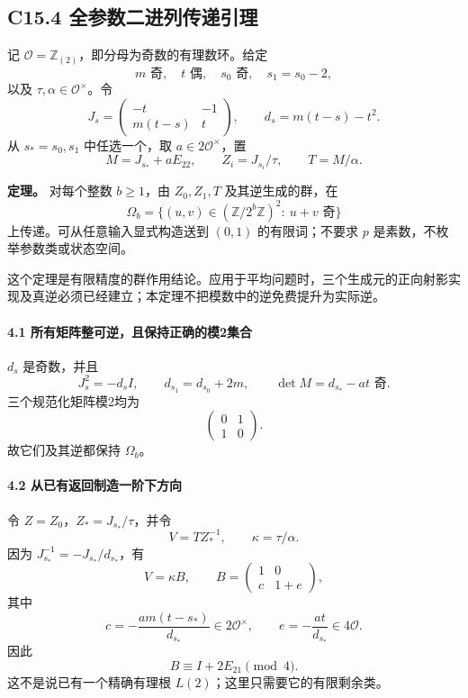 \documentclass[11pt,a4paper]{article}
\theoremstyle{definition}
\numberwithin{equation}{section}
\begin{document}
\subsection*{\texorpdfstring{{C15.4} {全参数二进列传递引理}}{C15.4 全参数二进列传递引理}}\label{C15-h107}

{记} \(\mathcal O=\mathbb Z_{(2)}\){，即分母为奇数的有理数环。给定} \[
m\text{ 奇},\quad t\text{ 偶},\quad s_0\text{ 奇},\quad s_1=s_0-2,
\] {以及} \(\tau,\alpha\in\mathcal O^\times\){。令} \[
J_s=\begin{pmatrix}-t&-1\\m(t-s)&t\end{pmatrix},
\qquad d_s=m(t-s)-t^2.
\] {从} \(s_*=s_0,s_1\) {中任选一个，取} \(a\in2\mathcal O^\times\){，置} \[
M=J_{s_*}+aE_{22},\qquad
Z_i=J_{s_i}/\tau,\qquad T=M/\alpha.
\]

\textbf{{定理。}} {对每个整数} \(b\ge1\){，由} \(Z_0,Z_1,T\) {及其逆生成的群，在} \[
\Omega_b=\{(u,v)\in(\mathbb Z/2^b\mathbb Z)^2:\ u+v\text{ 奇}\}
\] {上传递。可从任意输入显式构造送到} \((0,1)\) {的有限词；不要求} \(p\) {是素数，不枚举参数类或状态空间。}

{这个定理是有限精度的群作用结论。应用于平均问题时，三个生成元的正向射影实现及真逆必须已经建立；本定理不把模数中的逆免费提升为实际逆。}

\paragraph*{\texorpdfstring{{4.1} {所有矩阵整可逆，且保持正确的模2集合}}{4.1 所有矩阵整可逆，且保持正确的模2集合}}\label{C15-h108}

\(d_s\) {是奇数，并且} \[
J_s^2=-d_sI,\qquad
d_{s_1}=d_{s_0}+2m,\qquad
\det M=d_{s_*}-at\text{ 奇}.
\] {三个规范化矩阵模2均为} \[
\begin{pmatrix}0&1\\1&0\end{pmatrix}.
\] {故它们及其逆都保持} \(\Omega_b\){。}

\paragraph*{\texorpdfstring{{4.2} {从已有返回制造一阶下方向}}{4.2 从已有返回制造一阶下方向}}\label{C15-h109}

{令} \(Z=Z_0\){，}\(Z_*=J_{s_*}/\tau\){，并令} \[
V=T Z_*^{-1},\qquad \kappa=\tau/\alpha.
\] {因为} \(J_{s_*}^{-1}=-J_{s_*}/d_{s_*}\){，有} \[
V=\kappa B,\qquad
B=\begin{pmatrix}1&0\\c&1+e\end{pmatrix},
\] {其中} \[
c=-\frac{am(t-s_*)}{d_{s_*}}\in2\mathcal O^\times,
\qquad e=-\frac{at}{d_{s_*}}\in4\mathcal O.
\tag{C15.4.1}
\] {因此} \[
B\equiv I+2E_{21}\pmod4.
\] {这不是说已有一个精确有理根} \(L(2)\){；这里只需要它的有限剩余类。}
\end{document}
